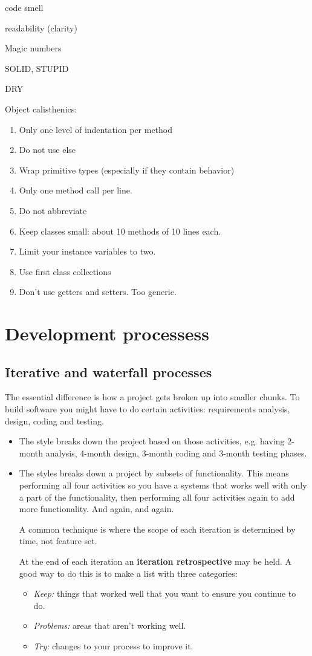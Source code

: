 code smell

readability (clarity)

Magic numbers

SOLID, STUPID

DRY

Object calisthenics:
\begin{enumerate}
\item Only one level of indentation per method
\item Do not use else
\item Wrap primitive types (especially if they contain behavior)
\item Only one method call per line.
\item Do not abbreviate
\item Keep classes small: about 10 methods of 10 lines each.
\item Limit your instance variables to two.
\item Use first class collections
\item Don't use getters and setters. Too generic.
\end{enumerate}

\section{Development processess}
\subsection{Iterative and waterfall processes}
The essential difference is how a project gets broken up into smaller chunks. To build software you might have to do certain activities: requirements analysis, design, coding and testing.

\begin{itemize}
\item The  style breaks down the project based on those activities, e.g. having 2-month analysis, 4-month design, 3-month coding and 3-month testing phases.
\item The  styles breaks down a project by subsets of functionality. This means performing all four activities so you have a systems that works well with only a part of the functionality, then performing all four activities again to add more functionality. And again, and again.

A common technique is  where the scope of each iteration is determined by time, not feature set.

At the end of each iteration an \textbf{iteration retrospective} may be held. A good way to do this is to make a list with three categories:
\begin{itemize}
\item \textit{Keep:} things that worked well that you want to ensure you continue to do.
\item \textit{Problems:} areas that aren't working well.
\item \textit{Try:} changes to your process to improve it.
\end{itemize}
\end{itemize}

